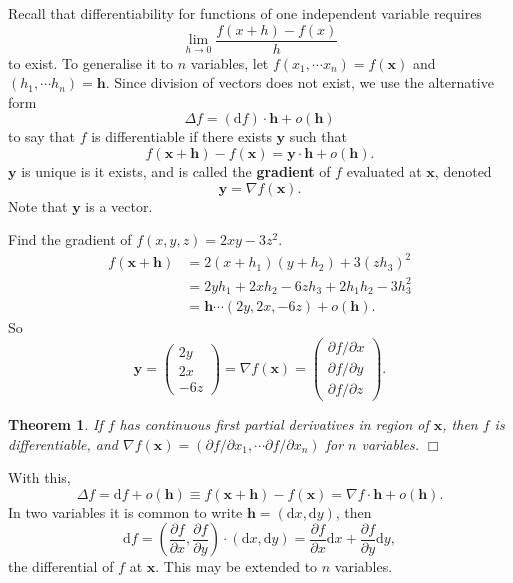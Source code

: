 \documentclass[letter-paper]{tufte-book}
\newtheorem{theorem}{\color{pastel-blue}Theorem}[section]
\newenvironment{example}[1][Example]{\begin{trivlist}
\item[\hskip \labelsep {\bfseries #1}]}{\end{trivlist}}
\newcommand{\dy}{\partial}
\newcommand{\ddy}[2]{\frac{\dy#1}{\dy#2}}
\newcommand{\xb}{\boldsymbol{x}}
\newcommand{\yb}{\boldsymbol{y}}
\newcommand\Def[1]{\textbf{#1}}
\newcommand{\qedwhite}{\hfill \ensuremath{\Box}}
\begin{document}
Recall that differentiability for functions of one independent variable requires
\begin{equation*}
  \lim_{h\to0}\frac{f(x+h)-f(x)}{h}
\end{equation*}
to exist. To generalise it to $n$ variables, let $f(x_1,\cdots x_n)=f(\xb)$ and
$(h_1,\cdots h_n)=\boldsymbol{h}$. Since division of vectors does not exist, we
use the alternative form 
\begin{equation*}
  \Delta f=(\mathrm{d}f)\cdot\boldsymbol{h}+o(\boldsymbol{h})
\end{equation*}
to say that $f$ is differentiable if there exists $\yb$ such that
\begin{equation*}
  f(\xb+\boldsymbol{h})-f(\xb)=\yb\cdot\boldsymbol{h}+o(\boldsymbol{h}).
\end{equation*}
$\yb$ is unique is it exists, and is called the \Def{gradient} of $f$
evaluated at $\xb$, denoted
\begin{equation*}
  \yb=\nabla f(\xb).
\end{equation*}
Note that $\yb$ is a vector.
\begin{example}
  Find the gradient of $f(x,y,z)=2xy-3z^2$.
  \begin{equation*}\begin{aligned}
    f(\xb+\boldsymbol{h}) &=2(x+h_1)(y+h_2)+3(z h_3)^2\\
    &= 2yh_1 + 2x h_2 - 6z h_3 + 2h_1 h_2 - 3h_3^2\\
    &= \boldsymbol{h}\cdots(2y,2x,-6z)+o(\boldsymbol{h}).
  \end{aligned}\end{equation*}
  So
  \begin{equation*}
    \yb=\begin{pmatrix}2y\\ 2x\\ -6z\end{pmatrix}=\nabla f(\xb)
    =\begin{pmatrix}\dy f/\dy x\\ \dy f/\dy y\\ \dy f/\dy z\end{pmatrix}.
  \end{equation*}
\end{example}

\begin{theorem}
  If $f$ has continuous first partial derivatives in region of $\xb$, then $f$
  is differentiable, and $\nabla f(\xb)=(\dy f/\dy x_1,\cdots \dy f/\dy x_n)$ for
  $n$ variables. \qedwhite
\end{theorem}
With this,
\begin{equation*}
  \Delta f=\mathrm{d}f+o(\boldsymbol{h})\equiv f(\xb+\boldsymbol{h})-f(\xb)
  =\nabla f\cdot \boldsymbol{h}+o(\boldsymbol{h}).
\end{equation*}
In two variables it is common to write $\boldsymbol{h} =(\mathrm{d}x,
\mathrm{d}y)$, then
\begin{equation*}
  \mathrm{d}f=\left(\ddy{f}{x},\ddy{f}{y}\right)\cdot(\mathrm{d}x, \mathrm{d}y)
  =\ddy{f}{x}\mathrm{d} x+\ddy{f}{y}\mathrm{d}y,
\end{equation*}
the differential of $f$ at $\xb$. This may be extended to $n$ variables.
\end{document}

